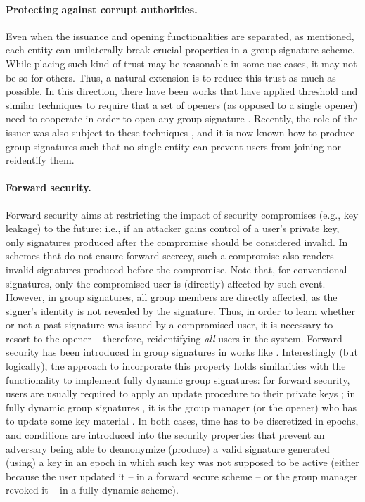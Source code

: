 \paragraph{Protecting against corrupt authorities.}
Even when the issuance and opening functionalities are separated, as mentioned,
each entity can unilaterally break crucial properties in a group signature scheme.
While placing such kind of trust may be reasonable in some use cases, it may not
be so for others. Thus, a natural extension is to reduce this trust as much as
possible. In this direction, there have been works that have applied threshold
and similar techniques \needcite to require that a set of openers (as opposed
to a single opener) need to cooperate in order to open any group signature
\cite{bcly08} \needcite.
Recently, the role of the issuer was also subject to these techniques
\cite{cdl+20}, and it is now known how to produce group signatures such that no
single entity can prevent users from joining nor reidentify them.

\paragraph{Forward security.}
Forward security aims at restricting the impact of security compromises (e.g.,
key leakage) to the future: i.e., if an attacker gains control of a user's
private key, only signatures produced after the compromise should be considered
invalid. In schemes that do not ensure forward secrecy, such a compromise also
renders invalid signatures produced before the compromise. Note that, for
conventional signatures, only the compromised user is (directly) affected by
such event. However,  in group signatures, all group members are directly
affected, as the signer's identity is not revealed by the signature. Thus,
in order to learn whether or not a past signature was issued by a compromised
user, it is necessary to resort to the opener -- therefore, reidentifying
\emph{all} users in the system.
%
Forward security has been introduced in group signatures in works like
\cite{song01,ly12}.
%
Interestingly (but logically), the approach to incorporate this property
holds similarities with the functionality to implement fully dynamic group
signatures: for forward security, users are usually required to apply an
update procedure to their private keys \cite{ly12}; in fully dynamic group
signatures , it is the
group manager (or the opener) who has to update some
key material \cite{bcc+16}. In both cases, time has to be discretized in epochs,
and conditions are introduced into the security properties that prevent an
adversary being able to deanonymize (produce) a valid signature generated
(using) a key in an epoch in which such key was not supposed to be active
(either because the user updated it -- in a forward secure scheme -- or the
group manager revoked it -- in a fully dynamic scheme).

